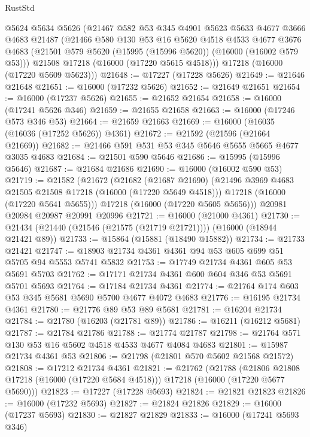 \begin{lexlean}{RustStd}
\begin{coremodule}
    @5624
    @5634
    @5626
    (@21467
      @582
      @53
      @345
      @4901
      @5623
      @5633
      @4677
      @3666
      @4683
      @21487
      (@21466
        @580
        @130
        @53
        @16
        @5620
        @4518
        @4533
        @4677
        @3676
        @4683
        (@21501 @579 @5620 (@15995 (@15996 @5620)) (@16000 (@16002 @579 @53)))
        @21508
        @17218
        (@16000 (@17220 @5615 @4518)))
      @17218
      (@16000 (@17220 @5609 @5623)))
@21648 := @17227 (@17228 @5626)
@21649 := @21646 @21648
@21651 := @16000 (@17232 @5626)
@21652 := @21649 @21651
@21654 := @16000 (@17237 @5626)
@21655 := @21652 @21654
@21658 := @16000 (@17241 @5626 @346)
@21659 := @21655 @21658
@21663 := @16000 (@17246 @573 @346 @53)
@21664 := @21659 @21663
@21669 := @16000 (@16035 (@16036 (@17252 @5626)) @4361)
@21672 := @21592 (@21596 (@21664 @21669))
@21682 := @21466 @591 @531 @53 @345 @5646 @5655 @5665 @4677 @3035 @4683
@21684 := @21501 @590 @5646
@21686 := @15995 (@15996 @5646)
@21687 := @21684 @21686
@21690 := @16000 (@16002 @590 @53)
@21719 := @21582
    (@21672
      (@21682
        (@21687 @21690)
        (@21496 @3969 @4683 @21505 @21508 @17218 (@16000 (@17220 @5649 @4518)))
        @17218
        (@16000 (@17220 @5641 @5655)))
      @17218
      (@16000 (@17220 @5605 @5656)))
    @20981
    @20984
    @20987
    @20991
    @20996
@21721 := @16000 (@21000 @4361)
@21730 := @21434 (@21440 (@21546 (@21575 (@21719 @21721)))) (@16000 (@18944 @21421 @89))
@21733 := @15864 (@15881 (@18490 @15882))
@21734 := @21733 @21421
@21747 := @18903 @21734 @4361 @4361 @94 @53 @605 @699 @51 @5705 @94 @5553 @5741 @5832
@21753 := @17749 @21734 @4361 @605 @53 @5691 @5703
@21762 := @17171 @21734 @4361 @600 @604 @346 @53 @5691 @5701 @5693
@21764 := @17184 @21734 @4361
@21774 := @21764 @174 @603 @53 @345 @5681 @5690 @5700 @4677 @4072 @4683
@21776 := @16195 @21734 @4361
@21780 := @21776 @89 @53 @89 @5681
@21781 := @16204 @21734
@21784 := @21780 (@16203 (@21781 @89))
@21786 := @16211 (@16212 @5681)
@21787 := @21784 @21786
@21788 := @21774 @21787
@21798 := @21764 @571 @130 @53 @16 @5602 @4518 @4533 @4677 @4084 @4683
@21801 := @15987 @21734 @4361 @53
@21806 := @21798 (@21801 @570 @5602 @21568 @21572)
@21808 := @17212 @21734 @4361
@21821 := @21762
    (@21788
      (@21806 @21808 @17218 (@16000 (@17220 @5684 @4518)))
      @17218
      (@16000 (@17220 @5677 @5690)))
@21823 := @17227 (@17228 @5693)
@21824 := @21821 @21823
@21826 := @16000 (@17232 @5693)
@21827 := @21824 @21826
@21829 := @16000 (@17237 @5693)
@21830 := @21827 @21829
@21833 := @16000 (@17241 @5693 @346)

\end{coremodule}
\end{lexlean}
